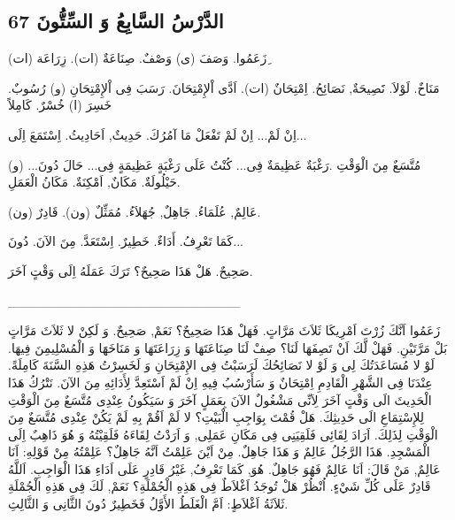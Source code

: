 \documentclass[a5paper]{article}
\begin{document}
\subsection{الدَّرْسُ السَّابِعُ وَ السِّتُّونَ 67}
زَعَمُوا. وَصَفَ (ى) وَصْفٌ. صِنَاعَةٌ (ات). زِرَاعَة (ات)ِ

مَنَاخٌ. لَوْلاَ. نََصِيحَةٌ, نَصَائِحُ. اِمْتِحَانٌ (ات). اَدَّى اْلإِمْتِحَانَ. رَسَبَ فِى اْلإِمْتِحَانِ (و) رُسُوبٌ. خَسِرَ (ا) خُسْرٌ. كَامِلاً

اِنْ لَمْ... اِنْ لَمْ تَفْعَلْ مَا آمُرُكَ. حَدِيثٌ, اَحَادِيثُ. اِسْتَمَعَ اِلَى...ِ

مُتَّسَعٌ مِنَ الْوَقْتِ .رَغْبَةٌ عَظِيمَةٌ فِى... كُنْتُ عَلَى رَغْبَةٍ عَظِيمَةٍ فِى... حَالَ دُونَ... (و) حَيْلُولَةٌ. مَكَانٌ, اَمْكِنَةٌ. مَكَانُ الْعَمَلِ.ِ

عَالِمٌ, عُلَمَاءُ. جَاهِلٌ, جُهَلاَءُ. مُمَثِّلٌ (ون). قَادِرٌ (ون).ِ

كَمَا تَعْرِفُ. أَدَاءٌ. خَطِيرٌ. اِسْتَعَدَّ. مِنَ الآنَ. دُونَ...ِ

صَحِيحٌ. هَلْ هَذَا صَحِيحٌ؟ تَرَكَ عَمَلَهُ اِلَى وَقْتٍ آخَرَ. 

\_\_\_\_\_\_\_\_\_\_\_\_\_\_\_\_\_\_\_\_\_\_\_\_\_

زَعَمُوا اَنَّكَ زُرْتَ اَمْرِيكَا ثَلاَثَ مَرَّاتٍ. فَهَلْ هَذَا صَحِيحٌ؟ نَعَمْ, صَحِيحٌ. وَ لَكِنْ لا ثَلاَثَ مَرَّاتٍ بَلْ مَرَّتَيْنِ. فَهَلْ لَّكَ اَنْ تَصِفَهَا لَنَا؟ صِفْ لَنَا صِنَاعَتَهَا وَ زِرَاعَتَهَا وَ مَنَاخَهََا وَ الْمُسْلِيمِنَ فِيهَا. لَوْ لا مُسَاعَدَتُكَ لِى وَ لَوْ لا نَصَائِحُكَ لَرَسَبْتُ فِى الإِمْتِحَانِ وَ لَخَسِرْتُ هَذِهِ السَّنَةَ كَامِلَةً. عِنْدَنَا فِى الشَّهْرِ الْقَادِمِ اِمْتِحَانٌ وَ سَأَرْسُبُ فِيهِ اِنْ لَمْ اَسْتَعِدَّ لِأَدَائِهِ مِنَ الآنَ. نَتْرُكُ هَذَا الْحَدِيثَ الَى وَقْتٍ آخَرَ لِاَنِّى مَشْغُولٌ الآنَ بِعَمَلٍ آخَرَ وَ سَيَكُونُ عِنْدِى مُتَّسَعٌ مِنَ الْوَقْتِ لِلإِسْتِمَاعِ الَى حَدِيثِكَ. هَلْ قُمْتَ بِوَاجِبِ الْبَيْتِ؟ لا لَمْ اَقُمْ بِهِ لَمْ يَكُنْ عِنْدِى مُتَّسَعٌ مِنَ الْوَقْتِ لِذَلِكَ. اَرَادَ لِقَائِى فَلَقِيَنِى فِى مَكَانِ عَمَلِى, وَ اَرَدْتُ لِقَاءَهُ فَلَقِيْتُهُ وَ هُوَ ذَاهِبٌ اِلَى الْمَسْجِدِ. هَذَا الرَّجُلُ عَالِمٌ وَ هَذَا جَاهِلٌ. مِنْ اَيْنَ عَلِمْتُ اَنَّهُ جَاهِلٌ؟ عَلِمْتُهُ مِنْ قَوْلِهِ: اَنَا عَالِمٌ, مَنْ قَالَ: اَنَا عَالِمٌ فَهُوَ جَاهِلٌ. هُوَ, كَمَا تَعْرِفُ, غَيْرُ قَادِرٍ عَلَى اَدَاءِ هَذَا الْوَاجِبِ. اَللَّهُ قَادِرٌ عَلَى كُلِّ شَيْءٍ. اُنْظُرْ هَلْ تُوجَدُ اَغْلاَطٌ فِى هَذِهِ الْجُمْلَةِ؟ نَعَمْ, لَكَ فِى هَذِهِ الْجُمْلَةِ ثَلاَثَةُ اَغْلاَطٍ: اَمَّ الْغَلَطُ الأَوَّلُ فَخَطِيرٌ دُونَ الثَّانِى وَ الثَّالِثِ.
\end{document}
